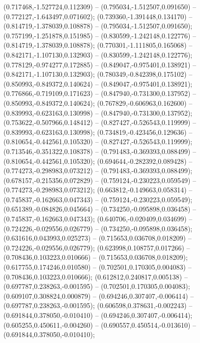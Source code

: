  (0.717468,-1.527724,0.112309) -- (0.795034,-1.512507,0.091650) -- (0.772127,-1.643497,0.071602);
 (0.739360,-1.391448,0.134170) -- (0.814719,-1.378039,0.108878) -- (0.795034,-1.512507,0.091650);
 (0.757199,-1.251878,0.151985) -- (0.830599,-1.242148,0.122776) -- (0.814719,-1.378039,0.108878);
 (0.770301,-1.111805,0.165068) -- (0.842171,-1.107130,0.132903) -- (0.830599,-1.242148,0.122776);
 (0.778129,-0.974277,0.172885) -- (0.849047,-0.975401,0.138921) -- (0.842171,-1.107130,0.132903);
 (0.780349,-0.842398,0.175102) -- (0.850993,-0.849372,0.140624) -- (0.849047,-0.975401,0.138921);
 (0.776866,-0.719109,0.171623) -- (0.847940,-0.731300,0.137952) -- (0.850993,-0.849372,0.140624);
 (0.767829,-0.606963,0.162600) -- (0.839993,-0.623163,0.130998) -- (0.847940,-0.731300,0.137952);
 (0.753622,-0.507966,0.148412) -- (0.827427,-0.526543,0.119999) -- (0.839993,-0.623163,0.130998);
 (0.734819,-0.423456,0.129636) -- (0.810654,-0.442561,0.105320) -- (0.827427,-0.526543,0.119999);
 (0.713546,-0.351322,0.108378) -- (0.791483,-0.369393,0.088499) -- (0.810654,-0.442561,0.105320);
 (0.694644,-0.282392,0.089428) -- (0.774273,-0.298983,0.073212) -- (0.791483,-0.369393,0.088499);
 (0.678157,-0.215356,0.072829) -- (0.759124,-0.230223,0.059549) -- (0.774273,-0.298983,0.073212);
 (0.663812,-0.149663,0.058314) -- (0.745837,-0.162663,0.047343) -- (0.759124,-0.230223,0.059549);
 (0.651389,-0.084826,0.045664) -- (0.734250,-0.095898,0.036458) -- (0.745837,-0.162663,0.047343);
 (0.640706,-0.020409,0.034699) -- (0.724226,-0.029556,0.026779) -- (0.734250,-0.095898,0.036458);
 (0.631616,0.043993,0.025273) -- (0.715653,0.036708,0.018209) -- (0.724226,-0.029556,0.026779);
 (0.623998,0.108757,0.017266) -- (0.708436,0.103223,0.010666) -- (0.715653,0.036708,0.018209);
 (0.617755,0.174246,0.010580) -- (0.702501,0.170305,0.004083) -- (0.708436,0.103223,0.010666);
 (0.612812,0.240817,0.005138) -- (0.697787,0.238263,-0.001595) -- (0.702501,0.170305,0.004083);
 (0.609107,0.308824,0.000879) -- (0.694246,0.307407,-0.006414) -- (0.697787,0.238263,-0.001595);
 (0.606598,0.378631,-0.002243) -- (0.691844,0.378050,-0.010410) -- (0.694246,0.307407,-0.006414);
 (0.605255,0.450611,-0.004260) -- (0.690557,0.450514,-0.013610) -- (0.691844,0.378050,-0.010410);
